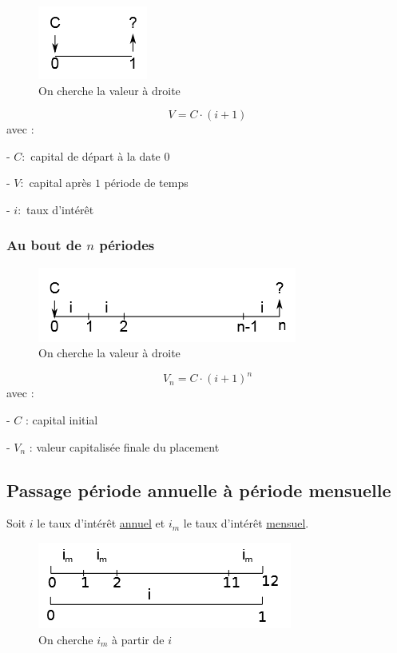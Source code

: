 \documentclass{article}
\begin{document}
\begin{figure}[h]
    \centering
    \includegraphics{c0-c1.png}
    \\On cherche la valeur à droite
\end{figure}

$$V = C\cdot(i+1)$$
avec :

- $C :$ capital de départ à la date 0

- $V :$ capital après $1$ période de temps

- $i :$ taux d'intérêt

\subsubsection{Au bout de $n$ périodes}

\begin{figure}[h]
    \centering
    \includegraphics{c0-cn.png}
    \\On cherche la valeur à droite
\end{figure}

$$\boxed{V_n = C\cdot(i+1)^n}$$
avec :

- $C$ : capital initial

- $V_n$ : valeur capitalisée finale du placement


\subsection{Passage période annuelle à période mensuelle}
Soit $i$ le taux d'intérêt \underline{annuel} et $i_m$ le taux d'intérêt \underline{mensuel}.

\begin{figure}[H]
    \centering
    \includegraphics{i-im.png}
    \\On cherche $i_m$ à partir de $i$
\end{figure}
\end{document}

